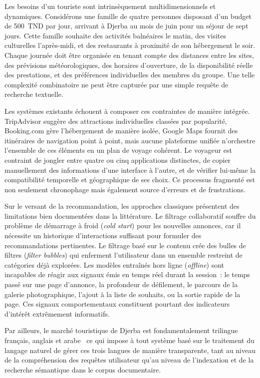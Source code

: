 Les besoins d'un touriste sont intrinsèquement multidimensionnels et dynamiques. Considérons une
famille de quatre personnes disposant d'un budget de 500~TND par jour, arrivant à Djerba au mois
de juin pour un séjour de sept jours. Cette famille souhaite des activités balnéaires le matin,
des visites culturelles l'après-midi, et des restaurants à proximité de son hébergement le soir.
Chaque journée doit être organisée en tenant compte des distances entre les sites, des prévisions
météorologiques, des horaires d'ouverture, de la disponibilité réelle des prestations, et des
préférences individuelles des membres du groupe. Une telle complexité combinatoire ne peut être
capturée par une simple requête de recherche textuelle.

Les systèmes existants échouent à composer ces contraintes de manière intégrée. TripAdvisor suggère
des attractions individuelles classées par popularité, Booking.com gère l'hébergement de manière
isolée, Google Maps fournit des itinéraires de navigation point à point, mais aucune plateforme
unifiée n'orchestre l'ensemble de ces éléments en un plan de voyage cohérent. Le voyageur est
contraint de jongler entre quatre ou cinq applications distinctes, de copier manuellement des
informations d'une interface à l'autre, et de vérifier lui-même la compatibilité temporelle et
géographique de ses choix. Ce processus fragmenté est non seulement chronophage mais également
source d'erreurs et de frustrations.

Sur le versant de la recommandation, les approches classiques présentent des limitations bien
documentées dans la littérature. Le filtrage collaboratif souffre du problème de démarrage à froid
(\textit{cold start}) pour les nouvelles annonces, car il nécessite un historique d'interactions
suffisant pour formuler des recommandations pertinentes. Le filtrage basé sur le contenu crée des
bulles de filtres (\textit{filter bubbles}) qui enferment l'utilisateur dans un ensemble restreint
de catégories déjà explorées. Les modèles entraînés hors ligne (\textit{offline}) sont incapables
de réagir aux signaux émis en temps réel durant la session~: le temps passé sur une page d'annonce,
la profondeur de défilement, le parcours de la galerie photographique, l'ajout à la liste de
souhaits, ou la sortie rapide de la page. Ces signaux comportementaux constituent pourtant des
indicateurs d'intérêt extrêmement informatifs.

Par ailleurs, le marché touristique de Djerba est fondamentalement trilingue~  français, anglais et
arabe~  ce qui impose à tout système basé sur le traitement du langage naturel de gérer ces trois
langues de manière transparente, tant au niveau de la compréhension des requêtes utilisateur qu'au
niveau de l'indexation et de la recherche sémantique dans le corpus documentaire.

